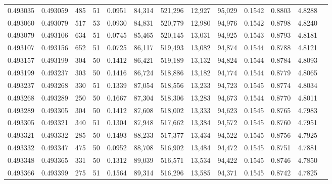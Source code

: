 \begin{tabular}{rrrrrrrrrrrrr}
0.493035 & 0.493059 & 485 &  51 &                                     0.0951 &  84,314 & 521,296 &  12,927 &  95,029 & 0.1542 & 0.8803 & 4.8288 \\
0.493060 & 0.493079 & 517 &  53 &                                     0.0930 &  84,831 & 520,779 &  12,980 &  94,976 & 0.1542 & 0.8798 & 4.8240 \\
0.493079 & 0.493106 & 634 &  51 &                                     0.0745 &  85,465 & 520,145 &  13,031 &  94,925 & 0.1543 & 0.8793 & 4.8181 \\
0.493107 & 0.493156 & 652 &  51 &                                     0.0725 &  86,117 & 519,493 &  13,082 &  94,874 & 0.1544 & 0.8788 & 4.8121 \\
0.493157 & 0.493199 & 304 &  50 &                                     0.1412 &  86,421 & 519,189 &  13,132 &  94,824 & 0.1544 & 0.8784 & 4.8093 \\
0.493199 & 0.493237 & 303 &  50 &                                     0.1416 &  86,724 & 518,886 &  13,182 &  94,774 & 0.1544 & 0.8779 & 4.8065 \\
0.493237 & 0.493268 & 330 &  51 &                                     0.1339 &  87,054 & 518,556 &  13,233 &  94,723 & 0.1545 & 0.8774 & 4.8034 \\
0.493268 & 0.493289 & 250 &  50 &                                     0.1667 &  87,304 & 518,306 &  13,283 &  94,673 & 0.1544 & 0.8770 & 4.8011 \\
0.493289 & 0.493305 & 304 &  50 &                                     0.1412 &  87,608 & 518,002 &  13,333 &  94,623 & 0.1545 & 0.8765 & 4.7983 \\
0.493305 & 0.493321 & 340 &  51 &                                     0.1304 &  87,948 & 517,662 &  13,384 &  94,572 & 0.1545 & 0.8760 & 4.7951 \\
0.493321 & 0.493332 & 285 &  50 &                                     0.1493 &  88,233 & 517,377 &  13,434 &  94,522 & 0.1545 & 0.8756 & 4.7925 \\
0.493332 & 0.493347 & 475 &  50 &                                     0.0952 &  88,708 & 516,902 &  13,484 &  94,472 & 0.1545 & 0.8751 & 4.7881 \\
0.493348 & 0.493365 & 331 &  50 &                                     0.1312 &  89,039 & 516,571 &  13,534 &  94,422 & 0.1545 & 0.8746 & 4.7850 \\
0.493366 & 0.493399 & 275 &  51 &                                     0.1564 &  89,314 & 516,296 &  13,585 &  94,371 & 0.1545 & 0.8742 & 4.7825 \\

\end{tabular}
